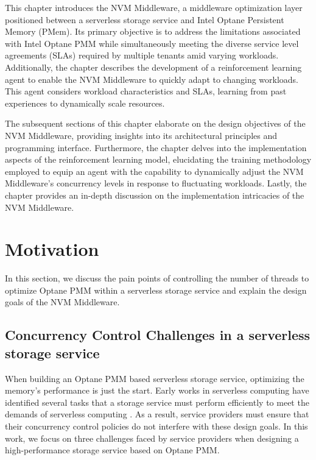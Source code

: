 This chapter introduces the NVM Middleware, a middleware optimization layer positioned between a serverless storage service and Intel Optane Persistent Memory (PMem). Its primary objective is to address the limitations associated with Intel Optane PMM while simultaneously meeting the diverse service level agreements (SLAs) required by multiple tenants amid varying workloads. Additionally, the chapter describes the development of a reinforcement learning agent to enable the NVM Middleware to quickly adapt to changing workloads. This agent considers workload characteristics and SLAs, learning from past experiences to dynamically scale resources.

The subsequent sections of this chapter elaborate on the design objectives of the NVM Middleware, providing insights into its architectural principles and programming interface. Furthermore, the chapter delves into the implementation aspects of the reinforcement learning model, elucidating the training methodology employed to equip an agent with the capability to dynamically adjust the NVM Middleware's concurrency levels in response to fluctuating workloads. Lastly, the chapter provides an in-depth discussion on the implementation intricacies of the NVM Middleware.

\section{Motivation}

In this section, we discuss the pain points of controlling the number of threads to optimize Optane PMM within a serverless storage service and explain the design goals of the NVM Middleware.

\subsection{Concurrency Control Challenges in a serverless storage service}

When building an Optane PMM based serverless storage service, optimizing the memory's performance is just the start. Early works in serverless computing have identified several tasks that a storage service must perform efficiently to meet the demands of serverless computing \cite{180275,jonas2019cloud,klimovic2018understanding,klimovic2018pocket,wu2019autoscaling,romero2021faat}. As a result, service providers must ensure that their concurrency control policies do not interfere with these design goals. In this work, we focus on three challenges faced by service providers when designing a high-performance storage service based on Optane PMM.

